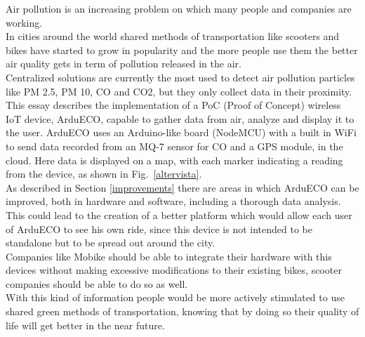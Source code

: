 \documentclass[conference]{IEEEtran}
\begin{document}
	Air pollution is an increasing problem on which many people and companies are working.\\
	In cities around the world shared methods of transportation like scooters and bikes have started to grow in popularity and the more people use them the better air quality gets in term of pollution released in the air.\\
	Centralized solutions are currently the most used to detect air pollution particles like PM 2.5, PM 10, CO and CO2, but they only collect data in their proximity.\\
	This essay describes the implementation of a PoC (Proof of Concept) wireless IoT device, ArduECO, capable to gather data from air, analyze and display it to the user.
	ArduECO uses an Arduino-like board (NodeMCU) with a built in WiFi to send data recorded from an MQ-7 sensor for CO and a GPS module, in the cloud.
	Here data is displayed on a map, with each marker indicating a reading from the device, as shown in Fig.~\ref{altervista}.\\
	As described in Section \ref{improvements} there are areas in which ArduECO can be improved, both in hardware and software, including a thorough data analysis.
	This could lead to the creation of a better platform which would allow each user of ArduECO to see his own ride, since this device is not intended to be standalone but to be spread out around the city.\\
	Companies like Mobike should be able to integrate their hardware with this devices without making excessive modifications to their existing bikes, scooter companies should be able to do so as well.\\
	With this kind of information people would be more actively stimulated to use shared green methods of transportation, knowing that by doing so their quality of life will get better in the near future.
		

\end{document}
